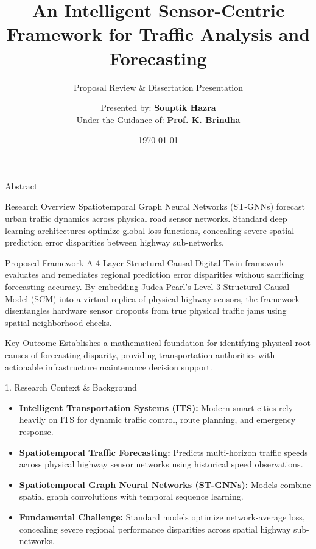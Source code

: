 \documentclass[aspectratio=169, 10pt]{beamer}
\title[Sensor-Centric Traffic Framework]{An Intelligent Sensor-Centric Framework for Traffic Analysis and Forecasting}
\subtitle{Proposal Review \& Dissertation Presentation}
\author[Souptik Hazra \& Prof. K. Brindha]{Presented by: \textbf{Souptik Hazra} \\[0.2cm] Under the Guidance of: \textbf{Prof. K. Brindha}}
\institute[Department of Computer Science]{Department of Computer Science \& Engineering}
\date{\today}
\begin{document}
\begin{frame}[plain]
  \titlepage
\end{frame}

\begin{frame}{Abstract}
  \begin{block}{Research Overview}
    Spatiotemporal Graph Neural Networks (ST-GNNs) forecast urban traffic dynamics across physical road sensor networks. Standard deep learning architectures optimize global loss functions, concealing severe spatial prediction error disparities between highway sub-networks.
  \end{block}

  \begin{block}{Proposed Framework}
    A 4-Layer Structural Causal Digital Twin framework evaluates and remediates regional prediction error disparities without sacrificing forecasting accuracy. By embedding Judea Pearl's Level-3 Structural Causal Model (SCM) into a virtual replica of physical highway sensors, the framework disentangles hardware sensor dropouts from true physical traffic jams using spatial neighborhood checks.
  \end{block}

  \begin{block}{Key Outcome}
    Establishes a mathematical foundation for identifying physical root causes of forecasting disparity, providing transportation authorities with actionable infrastructure maintenance decision support.
  \end{block}
\end{frame}

\begin{frame}{1. Research Context \& Background}
  \begin{itemize}
    \item \textbf{Intelligent Transportation Systems (ITS):} Modern smart cities rely heavily on ITS for dynamic traffic control, route planning, and emergency response.
    \item \textbf{Spatiotemporal Traffic Forecasting:} Predicts multi-horizon traffic speeds across physical highway sensor networks using historical speed observations.
    \item \textbf{Spatiotemporal Graph Neural Networks (ST-GNNs):} Models combine spatial graph convolutions with temporal sequence learning.
    \item \textbf{Fundamental Challenge:} Standard models optimize network-average loss, concealing severe regional performance disparities across spatial highway sub-networks.
  \end{itemize}
\end{frame}
\end{document}
